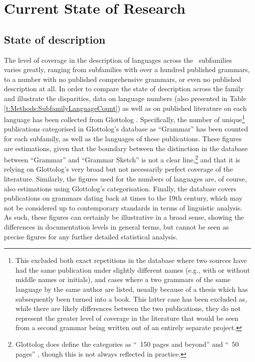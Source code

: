 \section{Current State of Research}\label{s:THOverview:CurrentResearch}
\subsection{State of description}\label{ss:Description:StateOfDescription}
The level of coverage in the description of languages across the \lfam\ subfamilies varies greatly, ranging from subfamilies with over a hundred published grammars, to a number with no published comprehensive grammars, or even no published description at all. In order to compare the state of description across the family and illustrate the disparities, data on language numbers (also presented in Table \ref{t:Methods:SubfamilyLanguageCount}) as well as on published literature on each language has been collected from Glottolog \cite{glottolog}. Specifically, the number of unique\footnote{This excluded both exact repetitions in the database where two sources have had the same publication under slightly different names (e.g., with or without middle names or initials), and cases where a two grammars of the same language by the same author are listed, usually because of a thesis which has subsequently been turned into a book. This latter case has been excluded as, while there are likely differences between the two publications, they do not represent the greater level of coverage in the literature that would be seen from a second grammar being written out of an entirely separate project.} publications categorised in Glottolog's database as ``Grammar'' has been counted for each subfamily, as well as the languages of these publications. These figures are estimations, given that the boundary between the distinction in the database between ``Grammar'' and ``Grammar Sketch'' is not a clear line,\footnote{Glottolog does define the categories as ``~150 pages and beyond'' and ``~50 pages'' \cite[Glossary]{glottolog}, though this is not always reflected in practice.} and that it is relying on Glottolog's very broad but not necessarily perfect coverage of the literature. Similarly, the figures used for the numbers of languages are, of course, also estimations using Glottolog's categorisation. Finally, the database covers publications on grammars dating back at times to the 19th century, which may not be considered up to contemporary standards in terms of linguistic analysis. As such, these figures can certainly be illustrative in a broad sense, showing the differences in documentation levels in general terms, but cannot be seen as precise figures for any further detailed statistical analysis.

